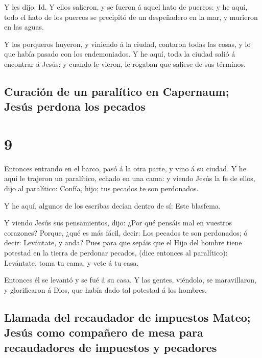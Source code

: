  Y les dijo: Id. Y ellos salieron, y se fueron á aquel
hato de puercos: y he aquí, todo el hato de los puercos se precipitó de
un despeñadero en la mar, y murieron en las aguas.

 Y los porqueros huyeron, y viniendo á la ciudad,
contaron todas las cosas, y lo que había pasado con los endemoniados.
 Y he aquí, toda la ciudad salió á encontrar á Jesús: y
cuando le vieron, le rogaban que saliese de sus términos.

\hypertarget{curaciuxf3n-de-un-paraluxedtico-en-capernaum-jesuxfas-perdona-los-pecados}{%
\subsection{Curación de un paralítico en Capernaum; Jesús perdona los
pecados}\label{curaciuxf3n-de-un-paraluxedtico-en-capernaum-jesuxfas-perdona-los-pecados}}

\hypertarget{section-40-9}{%
\section{9}\label{section-40-9}}

 Entonces entrando en el barco, pasó á la otra parte, y
vino á su ciudad.  Y he aquí le trajeron un paralítico,
echado en una cama: y viendo Jesús la fe de ellos, dijo al paralítico:
Confía, hijo; tus pecados te son perdonados.

 Y he aquí, algunos de los escribas decían dentro de sí:
Este blasfema.

 Y viendo Jesús sus pensamientos, dijo: ¿Por qué pensáis
mal en vuestros corazones?  Porque, ¿qué es más fácil,
decir: Los pecados te son perdonados; ó decir: Levántate, y anda?
 Pues para que sepáis que el Hijo del hombre tiene
potestad en la tierra de perdonar pecados, (dice entonces al
paralítico): Levántate, toma tu cama, y vete á tu casa.

 Entonces él se levantó y se fué á su casa. 
Y las gentes, viéndolo, se maravillaron, y glorificaron á Dios, que
había dado tal potestad á los hombres.

\hypertarget{llamada-del-recaudador-de-impuestos-mateo-jesuxfas-como-compauxf1ero-de-mesa-para-recaudadores-de-impuestos-y-pecadores}{%
\subsection{Llamada del recaudador de impuestos Mateo; Jesús como
compañero de mesa para recaudadores de impuestos y
pecadores}\label{llamada-del-recaudador-de-impuestos-mateo-jesuxfas-como-compauxf1ero-de-mesa-para-recaudadores-de-impuestos-y-pecadores}}

